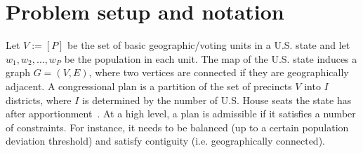 \section{Problem setup and notation}\label{sec:chap4 notation_setup}

Let $V:=[P]$ be the set of basic geographic/voting units in a U.S. state and let $w_1,w_2,\dots,w_P$ be the population in each unit.
The map of the U.S. state induces a graph $G=(V,E)$, where two vertices are connected if they are geographically adjacent.
A congressional plan is a partition of the set of precincts $V$ into $I$ districts, where $I$ is determined by the number of U.S. House seats the state has after apportionment~\cite{eckman2019apportionment}.
At a high level, a plan is admissible if it satisfies a number of constraints.
For instance, it needs to be balanced (up to a certain population deviation threshold) and satisfy contiguity (i.e. geographically connected).

